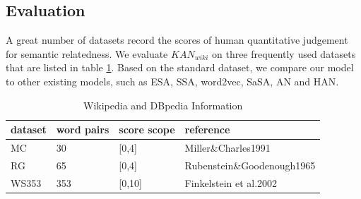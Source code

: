 \subsection{Evaluation}
A great number of datasets record the scores of human quantitative judgement
for semantic relatedness. We evaluate $KAN_{wiki}$ on three frequently used datasets that
are listed in table \ref{basicdataset}.
Based on the standard dataset, we compare our model to other existing models, such as
ESA\cite{ijcai/GabrilovichM07}, SSA\cite{aaai/HassanM11}, word2vec\cite{corr/Mikolov13},
SaSA\cite{aaai/WuG15}, AN\cite{aaai/ZhangZH15} and HAN\cite{aaai/GongXH18}.

\renewcommand\arraystretch{1.2}
\begin{table}
    \center
    \begin{tabular}{|p{1cm}|p{0.7cm}|p{0.7cm}|p{4.2cm}|}
    \hline
    dataset   & word pairs & score scope & reference \\ \hline
    MC        & 30         & [0,4]       & Miller\&Charles1991          \\ \hline 
    RG        & 65         & [0,4]       & Rubenstein\&Goodenough1965       \\ \hline
    WS353     & 353        & [0,10]      & Finkelstein et al.2002         \\ \hline
    \end{tabular}
    \caption{Wikipedia and DBpedia Information}
    \label{basicdataset}
\end{table}

